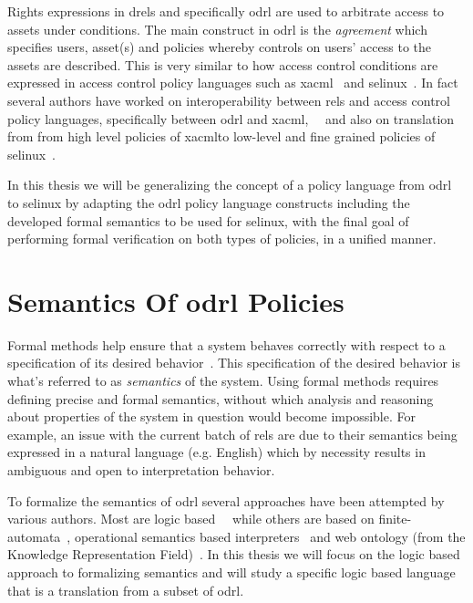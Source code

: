 Rights expressions in \ac{drel}s and specifically \ac{odrl} are used to arbitrate access to assets under conditions. The main construct in \ac{odrl} is the \emph{agreement} which specifies users, asset(s) and policies whereby controls on users' access to the assets are described. This is very similar to how access control conditions are expressed in access control policy languages such as \ac{xacml}~\cite{xacml} and \ac{selinux}~\cite{selinux}. In fact several authors have worked on interoperability between \ac{rel}s and access control policy languages, specifically between \ac{odrl} and \ac{xacml},~\cite{prados2005interoperability}~\cite{maronas2009architecture} and also on translation from from high level policies of \ac{xacml}to low-level and fine grained policies of \ac{selinux}~\cite{alam2008usage}. 

In this thesis we will be generalizing the concept of a policy language from \ac{odrl} to \ac{selinux} by adapting the \ac{odrl} policy language constructs including the developed formal semantics to be used for \ac{selinux}, with the final goal of performing formal verification on both types of policies, in a unified manner.



\section{Semantics Of \ac{odrl} Policies}


Formal methods help ensure that a system behaves correctly with respect to a specification of its desired behavior~\cite{TAPL}. This specification of the desired behavior is what's referred to as \emph{semantics} of the system. Using formal methods requires defining precise and formal semantics, without which analysis and reasoning about properties of the system in question would become impossible. For example, an issue with the current batch of \ac{rel}s are due to their semantics being expressed in a natural language (e.g. English) which by necessity results in ambiguous and open to interpretation behavior. 

To formalize the semantics of \ac{odrl} several approaches have been attempted by various authors. Most are logic based~\cite{Halpern2008}~\cite{pucella2006} while others are based on finite-automata~\cite{Holzer}, operational semantics based interpreters~\cite{Safavi-naini} and web ontology (from the Knowledge Representation Field)~\cite{Kasten2010MTS}. In this thesis we will focus on the logic based approach to formalizing semantics and will study a specific logic based language that is a translation from a subset of \ac{odrl}.



